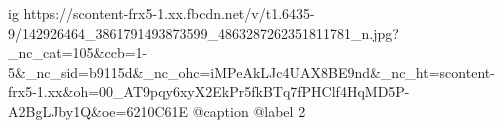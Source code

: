  
 
 
 
 

\ifcmt
  ig https://scontent-frx5-1.xx.fbcdn.net/v/t1.6435-9/142926464_3861791493873599_4863287262351811781_n.jpg?_nc_cat=105&ccb=1-5&_nc_sid=b9115d&_nc_ohc=iMPeAkLJc4UAX8BE9nd&_nc_ht=scontent-frx5-1.xx&oh=00_AT9pqy6xyX2EkPr5fkBTq7fPHClf4HqMD5P-A2BgLJby1Q&oe=6210C61E
  @caption @label 2
\fi
